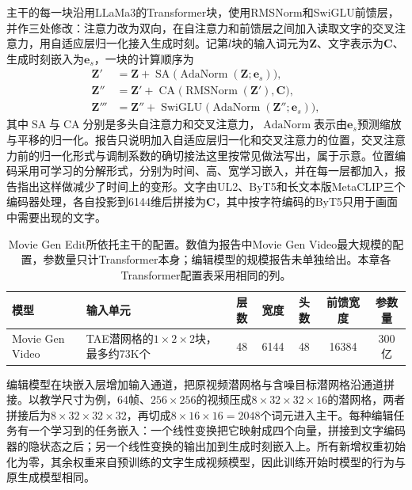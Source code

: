 主干的每一块沿用LLaMa3的Transformer块，使用RMSNorm和SwiGLU前馈层，并作三处修改：注意力改为双向，在自注意力和前馈层之间加入读取文字的交叉注意力，用自适应层归一化接入生成时刻。记第$l$块的输入词元为$\bm Z$、文字表示为$\bm C$、生成时刻嵌入为$\bm e_s$，一块的计算顺序为
\begin{equation}
 \begin{aligned}
  \bm Z'&=\bm Z+\operatorname{SA}\bigl(\operatorname{AdaNorm}(\bm Z;\bm e_s)\bigr),\\
  \bm Z''&=\bm Z'+\operatorname{CA}\bigl(\operatorname{RMSNorm}(\bm Z'),\bm C\bigr),\\
  \bm Z'''&=\bm Z''+\operatorname{SwiGLU}\bigl(\operatorname{AdaNorm}(\bm Z'';\bm e_s)\bigr),
 \end{aligned}
 \label{eq:vision-multigen-moviegen-block}
\end{equation}
其中$\operatorname{SA}$与$\operatorname{CA}$分别是多头自注意力和交叉注意力，$\operatorname{AdaNorm}$表示由$\bm e_s$预测缩放与平移的归一化。报告只说明加入自适应层归一化和交叉注意力的位置，交叉注意力前的归一化形式与调制系数的确切接法这里按常见做法写出，属于示意。位置编码采用可学习的分解形式，分别为时间、高、宽学习嵌入，并在每一层都加入，报告指出这样做减少了时间上的变形。文字由UL2、ByT5和长文本版MetaCLIP三个编码器处理，各自投影到6144维后拼接为$\bm C$，其中按字符编码的ByT5只用于画面中需要出现的文字。

\begin{table}[tbp]
 \centering
 \small
 \begin{tabularx}{\linewidth}{@{}p{28mm}Xccccc@{}}
  \toprule
  模型 & 输入单元 & 层数 & 宽度 & 头数 & 前馈宽度 & 参数量 \\
  \midrule
  Movie Gen Video & TAE潜网格的$1\times2\times2$块，最多约73K个 & 48 & 6144 & 48 & 16384 & 300亿 \\
  \bottomrule
 \end{tabularx}
 \caption{Movie Gen Edit所依托主干的配置。数值为报告中Movie Gen Video最大规模的配置，参数量只计Transformer本身；编辑模型的规模报告未单独给出。本章各Transformer配置表采用相同的列。}
 \label{tab:vision-multigen-edit-config}
\end{table}
\FloatBarrier

编辑模型在块嵌入层增加输入通道，把原视频潜网格与含噪目标潜网格沿通道拼接。以教学尺寸为例，64帧、$256\times256$的视频压成$8\times32\times32\times16$的潜网格，两者拼接后为$8\times32\times32\times32$，再切成$8\times16\times16=2048$个词元进入主干。每种编辑任务有一个学习到的任务嵌入：一个线性变换把它映射成四个向量，拼接到文字编码器的隐状态之后；另一个线性变换的输出加到生成时刻嵌入上。所有新增权重初始化为零，其余权重来自预训练的文字生成视频模型，因此训练开始时模型的行为与原生成模型相同。

